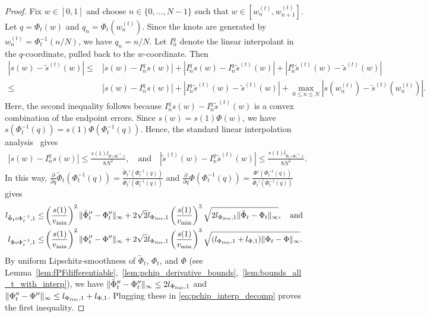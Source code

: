 \documentclass{article}
\newcommand{\Farc}{\Phi}
\begin{document}
\begin{proof}
Fix $w\in[0,1]$ and choose $n\in\{0,\dots,N-1\}$ such that
$w\in[w_n^{(t)},w_{n+1}^{(t)}]$. 
Let $q=\Farc_t(w)$ and $q_n=\Farc_t(w_n^{(t)})$. Since the knots are generated by
$w_n^{(t)}=\Farc_t^{-1}(n/N)$, we have $q_n=n/N$. Let $I_n^q$ denote the linear
interpolant in the $q$-coordinate, pulled back to the $w$-coordinate. Then
\begin{align}
|s(w)-\tilde s^{(t)}(w)|
\le &
|s(w)-I_n^q s(w)|
+
|I_n^q s(w)-I_n^q\tilde s^{(t)}(w)|
+
|I_n^q\tilde s^{(t)}(w)-\tilde s^{(t)}(w)|
\label{eq:pchip_interp_decomp} \\
\le &
|s(w)-I_n^q s(w)|
+
|I_n^q\tilde s^{(t)}(w)-\tilde s^{(t)}(w)|
+
\max_{0\le n\le N}|s(w_n^{(t)})-\tilde s^{(t)}(w_n^{(t)})|. \nonumber
\end{align}
Here, the second inequality follows because
$I_n^q s(w)-I_n^q\tilde s^{(t)}(w)$ is a convex combination of the endpoint
errors.
Since $s(w)=s(1)\Farc(w)$, we have
$s(\Farc_t^{-1}(q))=s(1)\Farc(\Farc_t^{-1}(q))$. Hence, the standard linear
interpolation analysis~\citep{suli2003introduction} gives
\begin{align}
 |s(w)-I_n^q s(w)| \le \frac{s(1)l_{\Farc\circ\Farc_t^{-1},1}}{8N^2}, \quad\text{and}\quad |\tilde s^{(t)}(w)-I_n^q\tilde s^{(t)}(w)| \le \frac{s(1)l_{\tilde\Farc_t\circ\Farc_t^{-1},1}}{8N^2}. 
\end{align}
In this way, $\frac{\partial}{\partial q}\tilde\Farc_t(\Farc_t^{-1}(q)) = \frac{\tilde\Farc_t'(\Farc_t^{-1}(q))}{\Farc_t'(\Farc_t^{-1}(q))}$ and $\frac{\partial}{\partial q}\Farc(\Farc_t^{-1}(q)) = \frac{\Farc'(\Farc_t^{-1}(q))}{\Farc_t'(\Farc_t^{-1}(q))}$ gives
\begin{align*}
 l_{\tilde\Farc_t\circ\Farc_t^{-1},1}\le & \left(\frac{s(1)}{v_{\min}}\right)^2\|\tilde\Farc_t''-\Farc_t''\|_\infty+2\sqrt2 l_{\Farc_{\rm iter},1}\left(\frac{s(1)}{v_{\min}}\right)^3\sqrt{2 l_{\Farc_{\rm iter},1}\|\tilde\Farc_t-\Farc_t\|_\infty},\quad \text{and}\\
 l_{\Farc\circ\Farc_t^{-1},1}\le & \left(\frac{s(1)}{v_{\min}}\right)^2\|\Farc_t''-\Farc''\|_\infty+2\sqrt2 l_{\Farc_{\rm iter},1}\left(\frac{s(1)}{v_{\min}}\right)^3\sqrt{(l_{\Farc_{\rm iter},1}+l_{\Farc,1})\|\Farc_t-\Farc\|_\infty}.
\end{align*}
By uniform Lipschitz-smoothness of $\tilde \Farc_t$, $\Farc_t$, and $\Farc$ (see~ Lemma~\ref{lem:fPFdifferentiable},~\ref{lem:pchip_derivative_bounds},~\ref{lem:bounds_all_t_with_interp}), we have $\| \tilde\Farc_t''-\Farc_t''\|_\infty \leq 2l_{\Farc_{\rm iter},1}$ and $\| \Farc_t''-\Farc''\|_\infty \leq l_{\Farc_{\rm iter},1}+l_{\Farc,1}$.
Plugging these in \eqref{eq:pchip_interp_decomp} proves the first inequality.


\end{proof}
\end{document}
